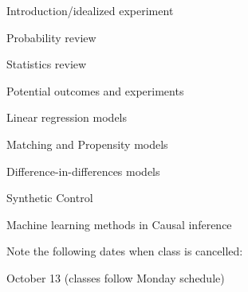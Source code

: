\documentclass[11 pt]{article}
\begin{document}
\begin{outline}
\item Introduction/idealized experiment


\item Probability review

\item Statistics review

%
\item Potential outcomes and experiments


\item Linear regression models 

\item Matching and Propensity models

\item Difference-in-differences models

\item Synthetic Control

\item Machine learning methods in Causal inference

\end{outline}

Note the following dates when class is cancelled:
\begin{blist}
\item October 13 (classes follow Monday schedule)
\end{blist}
\end{document}
